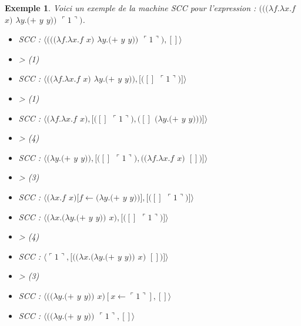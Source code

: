 \documentclass[10pt,a4paper]{report}
\newtheorem{ex}{Exemple}
\begin{document}
	\begin{ex}
		Voici un exemple de la machine SCC pour l'expression : $(((\lambda f.\lambda x.f$ $x)$ $\lambda y.(+$ $y$ $y))$ $\ulcorner 1\urcorner)$.
		
		\begin{multicols}{2}\raggedright{
				\begin{itemize}
					\item[] SCC : $\langle(((\lambda f.\lambda x.f$ $x)$ $\lambda y.(+$ $y$ $y))$ $\ulcorner 1\urcorner),[]\rangle$
					\item[] > (1)
					\item[] SCC : $\langle((\lambda f.\lambda x.f$ $x)$ $\lambda y.(+$ $y$ $y)),[([]$ $\ulcorner 1\urcorner)]\rangle$
					\item[] > (1)
					\item[] SCC : $\langle(\lambda f.\lambda x.f$ $x),[([]$ $\ulcorner 1\urcorner),([]$ $(\lambda y.(+$ $y$ $y)))]\rangle$
					\item[] > (4)
					\item[] SCC : $\langle(\lambda y.(+$ $y$ $y)),[([]$ $\ulcorner 1\urcorner),((\lambda f.\lambda x.f$ $x)$ $[])]\rangle$
					\item[] > (3) 
					\item[] SCC : $\langle(\lambda x.f$ $x)[f\leftarrow(\lambda y.(+$ $y$ $y))],[([]$ $\ulcorner 1\urcorner)]\rangle$
					\item[] SCC : $\langle(\lambda x.(\lambda y.(+$ $y$ $y))$ $x),[([]$ $\ulcorner 1\urcorner)]\rangle$
					\item[] > (4) 
					\item[] SCC : $\langle\ulcorner 1\urcorner,[((\lambda x.(\lambda y.(+$ $y$ $y))$ $x)$ $[])]\rangle$
					\item[] > (3) 
					\item[] SCC : $\langle((\lambda y.(+$ $y$ $y))$ $x)[x \leftarrow\ulcorner 1\urcorner],[]\rangle$
					\item[] SCC : $\langle((\lambda y.(+$ $y$ $y))$ $\ulcorner 1\urcorner,[]\rangle$
				\end{itemize}
				
}
\end{multicols}
\end{ex}
\end{document}
